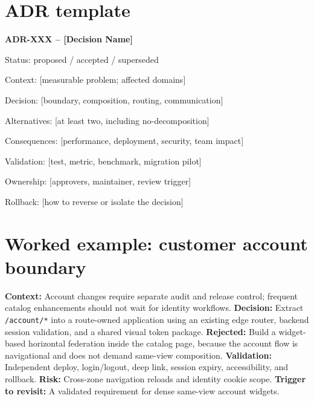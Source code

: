 \documentclass[11pt,letterpaper,oneside]{report}
\begin{document}
\section{ADR template}
\begin{sourcebox}
\textbf{ADR-XXX -- [Decision Name]}\par
Status: proposed / accepted / superseded\par
Context: [measurable problem; affected domains]\par
Decision: [boundary, composition, routing, communication]\par
Alternatives: [at least two, including no-decomposition]\par
Consequences: [performance, deployment, security, team impact]\par
Validation: [test, metric, benchmark, migration pilot]\par
Ownership: [approvers, maintainer, review trigger]\par
Rollback: [how to reverse or isolate the decision]
\end{sourcebox}
\section{Worked example: customer account boundary}
\textbf{Context:} Account changes require separate audit and release control; frequent catalog enhancements should not wait for identity workflows. \textbf{Decision:} Extract \texttt{/account/*} into a route-owned application using an existing edge router, backend session validation, and a shared visual token package. \textbf{Rejected:} Build a widget-based horizontal federation inside the catalog page, because the account flow is navigational and does not demand same-view composition. \textbf{Validation:} Independent deploy, login/logout, deep link, session expiry, accessibility, and rollback. \textbf{Risk:} Cross-zone navigation reloads and identity cookie scope. \textbf{Trigger to revisit:} A validated requirement for dense same-view account widgets.
\end{document}
